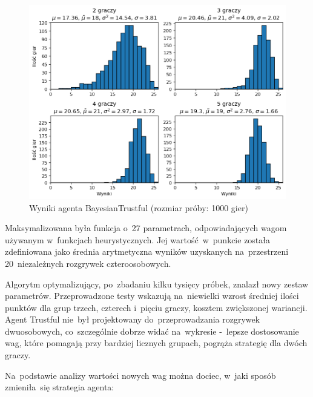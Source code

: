 \documentclass[declaration,shortabstract,inz]{iithesis}
\begin{document}
\begin{figure}[H]
	\centering
	\captionsetup{format=hang}
	\includegraphics[width=\textwidth,height=\textheight,keepaspectratio]{BayesianTrustful.png}
	\caption[Caption]{Wyniki agenta BayesianTrustful (rozmiar próby: 1000 gier)}
	\label{fig:BayesianTrustful}
\end{figure}

Maksymalizowana była funkcja o~27 parametrach, odpowiadających wagom używanym w~funkcjach heurystycznych. Jej wartość w~punkcie została zdefiniowana jako średnia arytmetyczna wyników uzyskanych na~przestrzeni 20~niezależnych rozgrywek czteroosobowych.

Algorytm optymalizujący, po~zbadaniu kilku tysięcy próbek, znalazł nowy zestaw parametrów. Przeprowadzone testy wskazują na~niewielki wzrost średniej ilości punktów dla grup trzech, czterech i~pięciu graczy, kosztem zwiększonej wariancji. Agent Trustful nie~był projektowany do~przeprowadzania rozgrywek dwuosobowych, co~szczególnie dobrze widać na~wykresie -~lepsze dostosowanie wag, które pomagają przy bardziej licznych grupach, pogrąża strategię dla dwóch graczy.

Na~podstawie analizy wartości nowych wag można dociec, w~jaki sposób zmieniła~się strategia agenta:
\end{document}
